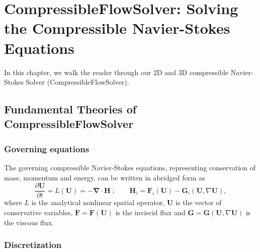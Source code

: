 \chapter{CompressibleFlowSolver: Solving the Compressible Navier-Stokes Equations}

In this chapter, we walk the reader through our 2D and 3D compressible Navier-Stokes Solver (CompressibleFlowSolver). 
\section{Fundamental Theories of CompressibleFlowSolver}
\subsection{{Governing equations}}\label{sec:CompNSEqs}
      The governing compressible Navier-Stokes equations, representing conservation of mass, momentum and energy, can be written in abridged form as
      \begin{equation}\label{eq:NS-Eqs}
          \frac{\partial \textbf{U}}{\partial t} = \textit{L}\left(\textbf{U}\right) = -\mathbf{\nabla}\cdot\mathbf{H}\; ; \qquad  \textbf{H}_{i} = 
          \textbf{F}_{i}(\textbf{U}) -
              \textbf{G}_{i}(\textbf{U},\nabla \textbf{U}), 
      \end{equation}
      where $\textit{L}$ is the analytical nonlinear spatial operator, $\textbf{U}$ is the vector of conservative variables, $\textbf{F}=\textbf{F}(\textbf{U})$ is the inviscid flux and $\textbf{G}=\textbf{G}(\textbf{U},\nabla \textbf{U})$ is the viscous flux.
    \subsection{{Discretization}}\label{sec:Spatial-discretization}

